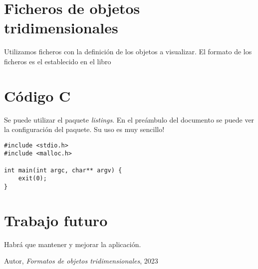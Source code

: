 \documentclass[12pt,a4paper]{article}
\begin{document}
\section{Ficheros de objetos tridimensionales\label{sec:ficheros-de-objetos}}

Utilizamos ficheros con la definición de los objetos a visualizar. El formato de los ficheros es el establecido en el libro \cite{key-1}


\section{Código C}

Se puede utilizar el paquete \textit{listings}. En el preámbulo del documento se puede ver la configuración del paquete. Su uso es muy sencillo!

\begin{lstlisting}
#include <stdio.h>
#include <malloc.h>

int main(int argc, char** argv) {
	exit(0);
}
\end{lstlisting}

\section{Trabajo futuro}

Habrá que mantener y mejorar la aplicación.

\begin{thebibliography}{Formats}
Autor, \emph{Formatos de objetos tridimensionales}, 2023 
\end{thebibliography}
\end{document}
